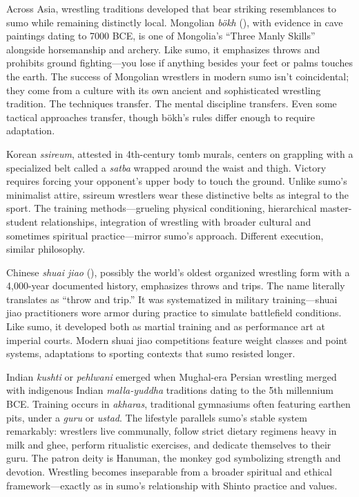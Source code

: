 Across Asia, wrestling traditions developed that bear striking resemblances to sumo while remaining distinctly local. Mongolian \textit{bökh} (), with evidence in cave paintings dating to 7000 BCE, is one of Mongolia's ``Three Manly Skills'' alongside horsemanship and archery. Like sumo, it emphasizes throws and prohibits ground fighting—you lose if anything besides your feet or palms touches the earth. The success of Mongolian wrestlers in modern sumo isn't coincidental; they come from a culture with its own ancient and sophisticated wrestling tradition. The techniques transfer. The mental discipline transfers. Even some tactical approaches transfer, though bökh's rules differ enough to require adaptation.

Korean \textit{ssireum}, attested in 4th-century tomb murals, centers on grappling with a specialized belt called a \textit{satba} wrapped around the waist and thigh. Victory requires forcing your opponent's upper body to touch the ground. Unlike sumo's minimalist attire, ssireum wrestlers wear these distinctive belts as integral to the sport. The training methods—grueling physical conditioning, hierarchical master-student relationships, integration of wrestling with broader cultural and sometimes spiritual practice—mirror sumo's approach. Different execution, similar philosophy.

Chinese \textit{shuai jiao} (), possibly the world's oldest organized wrestling form with a 4,000-year documented history, emphasizes throws and trips. The name literally translates as ``throw and trip.'' It was systematized in military training—shuai jiao practitioners wore armor during practice to simulate battlefield conditions. Like sumo, it developed both as martial training and as performance art at imperial courts. Modern shuai jiao competitions feature weight classes and point systems, adaptations to sporting contexts that sumo resisted longer.

Indian \textit{kushti} or \textit{pehlwani} emerged when Mughal-era Persian wrestling merged with indigenous Indian \textit{malla-yuddha} traditions dating to the 5th millennium BCE. Training occurs in \textit{akharas}, traditional gymnasiums often featuring earthen pits, under a \textit{guru} or \textit{ustad}. The lifestyle parallels sumo's stable system remarkably: wrestlers live communally, follow strict dietary regimens heavy in milk and ghee, perform ritualistic exercises, and dedicate themselves to their guru. The patron deity is Hanuman, the monkey god symbolizing strength and devotion. Wrestling becomes inseparable from a broader spiritual and ethical framework—exactly as in sumo's relationship with Shinto practice and values.

